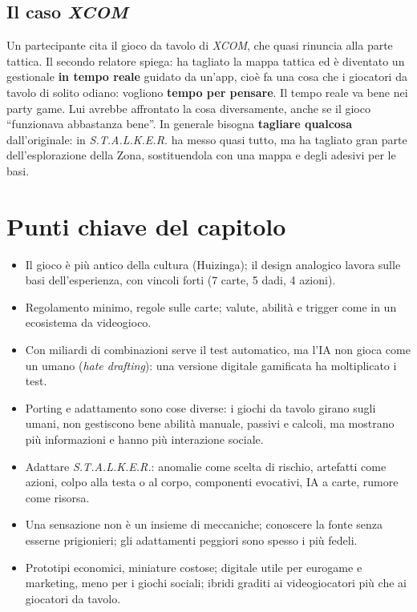 \subsection{Il caso \emph{XCOM}}

Un partecipante cita il gioco da tavolo di \emph{XCOM}, che quasi rinuncia alla parte
tattica. Il secondo relatore spiega: ha tagliato la mappa tattica ed è diventato un
gestionale \textbf{in tempo reale} guidato da un'app, cioè fa una cosa che i
giocatori da tavolo di solito odiano: vogliono \textbf{tempo per pensare}. Il tempo
reale va bene nei party game. Lui avrebbe affrontato la cosa diversamente, anche se
il gioco ``funzionava abbastanza bene''. In generale bisogna \textbf{tagliare
qualcosa} dall'originale: in \emph{S.T.A.L.K.E.R.} ha messo quasi tutto, ma ha
tagliato gran parte dell'esplorazione della Zona, sostituendola con una mappa e
degli adesivi per le basi.

\section*{Punti chiave del capitolo}

\begin{itemize}
  \item Il gioco è più antico della cultura (Huizinga); il design analogico lavora
        sulle basi dell'esperienza, con vincoli forti (7 carte, 5 dadi, 4 azioni).
  \item Regolamento minimo, regole sulle carte; valute, abilità e trigger come in un
        ecosistema da videogioco.
  \item Con miliardi di combinazioni serve il test automatico, ma l'IA non gioca come
        un umano (\emph{hate drafting}): una versione digitale gamificata ha
        moltiplicato i test.
  \item Porting e adattamento sono cose diverse: i giochi da tavolo girano sugli
        umani, non gestiscono bene abilità manuale, passivi e calcoli, ma mostrano
        più informazioni e hanno più interazione sociale.
  \item Adattare \emph{S.T.A.L.K.E.R.}: anomalie come scelta di rischio, artefatti
        come azioni, colpo alla testa o al corpo, componenti evocativi, IA a carte,
        rumore come risorsa.
  \item Una sensazione non è un insieme di meccaniche; conoscere la fonte senza
        esserne prigionieri; gli adattamenti peggiori sono spesso i più fedeli.
  \item Prototipi economici, miniature costose; digitale utile per eurogame e
        marketing, meno per i giochi sociali; ibridi graditi ai videogiocatori più
        che ai giocatori da tavolo.
\end{itemize}
